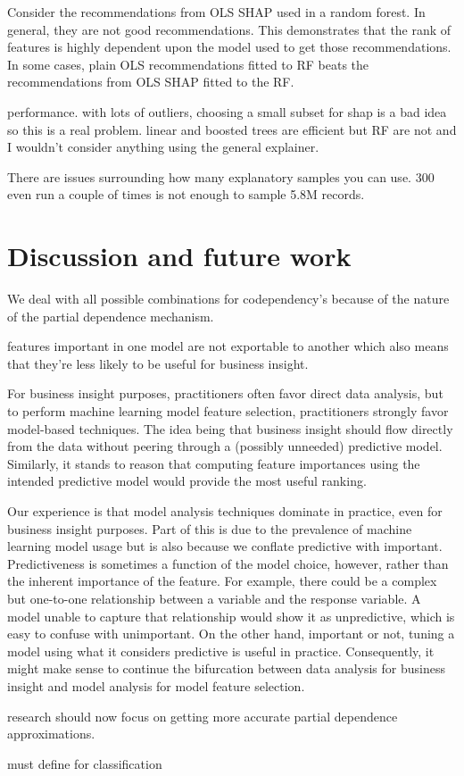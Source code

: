 \documentclass[11pt]{article}
\newcommand{\todo}[1]{{{\color{red}{[#1]}}}}
\begin{document}
Consider the recommendations from OLS SHAP used in a random forest. In general, they are not good recommendations. This demonstrates that the rank of features is highly dependent upon the model used to get those recommendations. In some cases, plain OLS recommendations fitted to RF beats the recommendations from OLS SHAP fitted to the RF.

performance. with lots of outliers, choosing a small subset for shap is a bad idea so this is a real problem. linear and boosted trees are efficient but RF are not and I wouldn't consider anything using the general explainer.

There are issues surrounding how many explanatory samples you can use. 300 even run a couple of times is not enough to sample 5.8M records.

\todo{We need min samples per x to avoid left edge issues as they skew entire pdp, which severely skews mass AUC.}

\todo{explain cat mechanism and how there is no left/right edge so no evidence used to weight AUC.}
 
\section{Discussion and future work}

We deal with all possible combinations for codependency's because of the nature of the partial dependence mechanism.

features important in one model are not exportable to another which also means that they're less likely to be useful for business insight.
 
For business insight purposes, practitioners often favor direct data analysis, but to perform machine learning model feature selection, practitioners strongly favor model-based techniques. The idea being that business insight should flow directly from the data without peering through a (possibly unneeded) predictive model.  Similarly, it stands to reason that computing feature importances using the intended predictive model would provide the most useful ranking.

Our experience is that model analysis techniques dominate in practice, even for business insight purposes. Part of this is due to the prevalence of machine learning model usage but is also because we conflate predictive with important.  Predictiveness is sometimes a function of the model choice, however, rather than the inherent importance of the feature. For example, there could be a complex but one-to-one relationship between a variable and the response variable. A model unable to capture that relationship would show it as unpredictive, which is easy to confuse with unimportant.  On the other hand, important or not, tuning a model using what it considers predictive is useful in practice. Consequently, it might make sense to continue the bifurcation between data analysis for business insight and model analysis for model feature selection.

research should now focus on getting more accurate partial dependence approximations.

must define for classification

\vskip 0.2in

\end{document}
